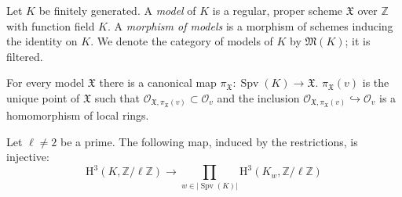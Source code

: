 \begin{definition}
Let $K$ be finitely generated. A \textit{model} of $K$ is a regular, proper scheme $\mathfrak{X}$ over $\mathbb{Z}$ with function field $K$. A \textit{morphism of models} is a morphism of schemes inducing the identity on $K$. We denote the category of models of $K$ by $\mathfrak{M}(K)$; it is filtered. 

For every model $\mathfrak{X}$ there is a canonical map $\pi_\mathfrak{X}:\operatorname{Spv}(K)\to\mathfrak{X}$. $\pi_\mathfrak{X}(v)$  is the unique point of $\mathfrak{X}$ such that $\mathcal{O}_{\mathfrak{X}, \pi_\mathfrak{X}(v)}\subset\mathcal{O}_v$ and the inclusion $\mathcal{O}_{\mathfrak{X}, \pi_\mathfrak{X}(v)}\hookrightarrow \mathcal{O}_v$ is a homomorphism of local rings.
\end{definition}

\iffalse
\begin{lemma}\phantomsection\label{2.3}
\begin{enumerate}[(i)]
\item $\operatorname{Spv}(K)$, together with the maps $\pi_{\mathfrak{X}}$, is the projective limit of topological spaces: 
\[\operatorname{Spv}(K) =\varprojlim_{\mathfrak{X}\in\mathfrak{M}(K)}\mathfrak{X}\]
In particular we have:
\[ |\operatorname{Spv}(K)| =\varprojlim_{\mathfrak{X}\in\mathfrak{M}(K)}|\mathfrak{X}| \]
\item For all $v\in\operatorname{Spv}(K)$ we have:
\[ \mathcal{O}_v = \varinjlim_{\mathfrak{X}\in\mathfrak{M}(K)}\mathcal{O}_{\mathfrak{X},\pi_\mathfrak{X}(v)} \]
\item For $v\in\operatorname{Spv}(K)$ let $K_v$ be the quotient field of a henselization of $\mathcal{O}_v$ and for $\mathfrak{X}\in\mathfrak{M}(K),\ x\in\mathfrak{X}$ let $K_\mathfrak{X}$ be the quotient field of a henselization of $\mathcal{O}_{\mathfrak{X},x}$. Then:
\[ K_v=\varinjlim_{\mathfrak{X}\in\mathfrak{M}(K)}K_{\pi_\mathfrak{X}(v)} \]
\end{enumerate}
\end{lemma}
\fi

\begin{lemma}\label{2.4}
Let $\ell\neq 2$ be a prime. The following map, induced by the restrictions, is injective:
\[ \mathrm{H}^3(K,\mathbb{Z}/\ell\mathbb{Z})\to\prod_{w\in |\operatorname{Spv}(K)| }\mathrm{H}^3(K_w,\mathbb{Z}/\ell\mathbb{Z}) \]
\end{lemma}

